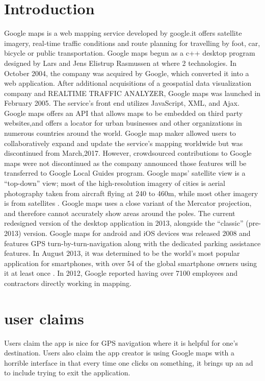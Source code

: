 \documentclass[10pt,]{article}
\begin{document}
\newpage

\section{Introduction}
Google maps is a web mapping service developed by google.it offers satellite imagery, real-time traffic conditions and route planning for travelling by foot, car, bicycle or public transportation. 
Google maps begun as a c++ desktop program designed by Lars and Jens Elistrup Rasmussen at where 2 technologies. In October 2004, the company was acquired by Google, which converted it into a web application. After additional acquisitions of a geospatial data visualization company and REALTIME TRAFFIC ANALYZER, Google maps was launched in February 2005\cite{s1}. The service’s front end utilizes JavaScript, XML, and Ajax.
Google maps offers an API that allows maps to be embedded on third party websites,and offers a locator for urban businesses and other organizations in numerous countries around the world. Google map maker allowed users to collaboratively expand and update the service’s mapping worldwide but was discontinued from March,2017. However, crowdsourced contributions to Google maps were not discontinued as the company announced those features will be transferred to Google Local Guides program\cite{s3}.
Google maps’ satellite view is a “top-down” view; most of the high-resolution imagery of cities is aerial photography taken from aircraft flying at 240 to 460m, while most other imagery is from satellites . Google maps uses a close variant of the Mercator projection, and therefore cannot accurately show areas around the poles.
The current redesigned version of the desktop application in 2013, alongside the “classic” (pre-2013) version. Google maps for android and iOS devices was released 2008 and features GPS turn-by-turn-navigation along with the dedicated parking assistance features. In August 2013, it was determined to be the world’s most popular application for smartphones, with over 54 of the global smartphone owners using it at least once \cite{s5}.
In 2012, Google reported having over 7100 employees and contractors directly working in mapping. \cite{s4}

\section{user claims}
Users claim the app is nice for GPS navigation where it is helpful for one’s destination.
Users also claim the app creator is using Google maps with a horrible interface in that every time one clicks on something, it brings up an ad to include trying to exit the application.




   
\end{document}
